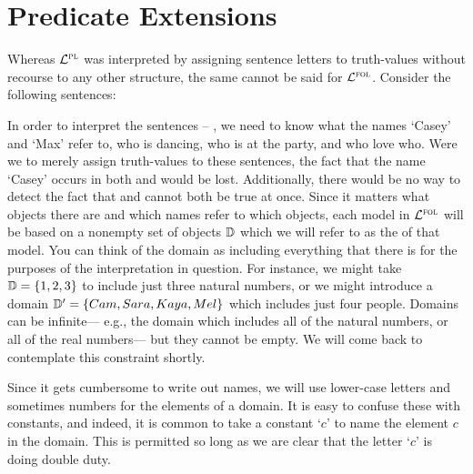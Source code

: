 \section{Predicate Extensions}

Whereas $\mathcal{L}^{\textsc{pl}}$ was interpreted by assigning sentence letters to truth-values without recourse to any other structure, the same cannot be said for $\mathcal{L}^{\textsc{fol}}$.
Consider the following sentences:

\begin{earg} \label{simple}
\end{earg}

In order to interpret the sentences  -- , we need to know what the names `Casey' and `Max' refer to, who is dancing, who is at the party, and who love who.
Were we to merely assign truth-values to these sentences, the fact that the name `Casey' occurs in both  and  would be lost.
Additionally, there would be no way to detect the fact that  and  cannot both be true at once.
Since it matters what objects there are and which names refer to which objects, each model in $\mathcal{L}^{\textsc{fol}}$ will be based on a nonempty set of objects $\mathbb{D}$ which we will refer to as the  of that model.
You can think of the domain as including everything that there is for the purposes of the interpretation in question.
For instance, we might take $\mathbb{D}=\lbrace1,2,3\rbrace$ to include just three natural numbers, or we might introduce a domain $\mathbb{D}'=\lbrace Cam, Sara, Kaya, Mel\rbrace$ which includes just four people.
Domains can be infinite--- e.g., the domain which includes all of the natural numbers, or all of the real numbers--- but they cannot be empty.
We will come back to contemplate this constraint shortly.

Since it gets cumbersome to write out names, we will use lower-case letters and sometimes numbers for the elements of a domain.
It is easy to confuse these with constants, and indeed, it is common to take a constant `$c$' to name the element $c$ in the domain.
This is permitted so long as we are clear that the letter `$c$' is doing double duty.

